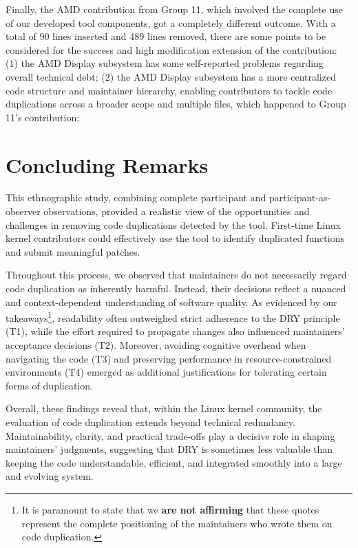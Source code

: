 \documentclass[10pt,conference]{IEEEtran}
\begin{document}
Finally, the AMD contribution from Group 11, which involved the complete use of our developed tool components, got a completely different outcome. With a total of 90 lines inserted and 489 lines removed, there are some points to be considered for the success and high modification extension of the contribution: (1) the AMD Display subsystem has some self-reported problems regarding overall technical debt; (2) the AMD Display subsystem has a more centralized code structure and maintainer hierarchy, enabling contributors to tackle code duplications across a broader scope and multiple files, which happened to Group 11's contribution;


\section{Concluding Remarks}

This ethnographic study, combining complete participant and participant-as-observer observations, provided a realistic view of the opportunities and challenges in removing code duplications detected by the tool. First-time Linux kernel contributors could effectively use the tool to identify duplicated functions and submit meaningful patches.

Throughout this process, we observed that maintainers do not necessarily regard code duplication as inherently harmful. Instead, their decisions reflect a nuanced and context-dependent understanding of software quality. As evidenced by our takeaways\footnote{It is paramount to state that we \textbf{are not affirming} that these quotes represent the complete positioning of the maintainers who wrote them on code duplication.}, readability often outweighed strict adherence to the DRY principle (T1), while the effort required to propagate changes also influenced maintainers’ acceptance decisions (T2). Moreover, avoiding cognitive overhead when navigating the code (T3) and preserving performance in resource-constrained environments (T4) emerged as additional justifications for tolerating certain forms of duplication.

Overall, these findings reveal that, within the Linux kernel community, the evaluation of code duplication extends beyond technical redundancy. Maintainability, clarity, and practical trade-offs play a decisive role in shaping maintainers’ judgments, suggesting that DRY is sometimes less valuable than keeping the code understandable, efficient, and integrated smoothly into a large and evolving system.
\end{document}
